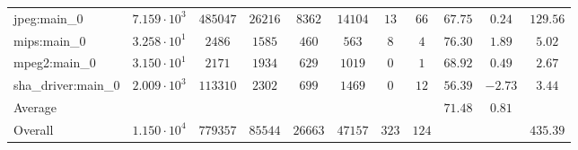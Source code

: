 \begin{tabular}{|l|c|c|c|c|c|c|c|c|c|c|}
jpeg:main\_0            & $ 7.159 \cdot 10^{3} $ & $ 485047 $ & $ 26216 $ & $ 8362  $ & $ 14104 $ & $ 13  $ & $ 66  $ & $ 67.75       $ & $ 0.24    $ & $ 129.56  $ \\
mips:main\_0            & $ 3.258 \cdot 10^{1} $ & $ 2486   $ & $ 1585  $ & $ 460   $ & $ 563   $ & $ 8   $ & $ 4   $ & $ 76.30       $ & $ 1.89    $ & $ 5.02    $ \\
mpeg2:main\_0           & $ 3.150 \cdot 10^{1} $ & $ 2171   $ & $ 1934  $ & $ 629   $ & $ 1019  $ & $ 0   $ & $ 1   $ & $ 68.92       $ & $ 0.49    $ & $ 2.67    $ \\
sha\_driver:main\_0     & $ 2.009 \cdot 10^{3} $ & $ 113310 $ & $ 2302  $ & $ 699   $ & $ 1469  $ & $ 0   $ & $ 12  $ & $ 56.39       $ & $ -2.73   $ & $ 3.44    $ \\
\hline
Average                 & $                    $ & $        $ & $       $ & $       $ & $       $ & $     $ & $     $ & $ 71.48       $ & $ 0.81    $ & $         $ \\
\hline
Overall                 & $ 1.150 \cdot 10^{4} $ & $ 779357 $ & $ 85544 $ & $ 26663 $ & $ 47157 $ & $ 323 $ & $ 124 $ & $             $ & $         $ & $ 435.39  $ \\
\hline
\end{tabular}
